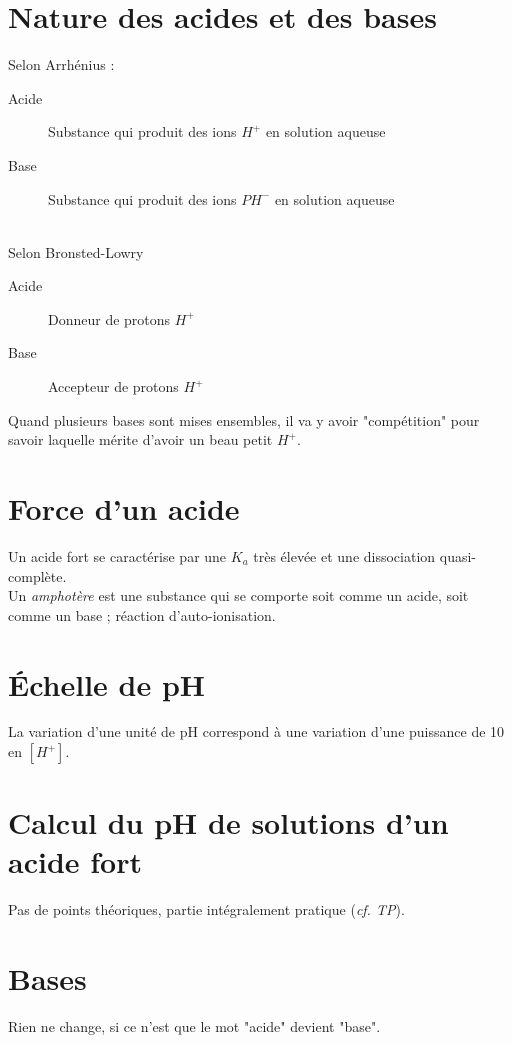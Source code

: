 \documentclass[british,french,11pt, a4paper, openany]{book}
\begin{document}
\section{Nature des acides et des bases}
Selon Arrhénius : 
\begin{description}
	\item[Acide] Substance qui produit des ions $H^+$ en solution aqueuse
	\item[Base] Substance qui produit des ions $PH^-$ en solution aqueuse
\end{description}
\ \\

Selon Bronsted-Lowry 
\begin{description}
	\item[Acide] Donneur de protons $H^+$
	\item[Base] Accepteur de protons $H^+$
\end{description}

Quand plusieurs bases sont mises ensembles, il va y avoir "compétition" pour savoir laquelle mérite d'avoir un beau petit $H^+$.

\section{Force d'un acide}
Un acide fort se caractérise par une $K_a$ très élevée et une dissociation quasi-complète.\\

Un \textit{amphotère} est une substance qui se comporte soit comme un acide, soit comme un base ; réaction d'auto-ionisation.

\section{Échelle de pH}
La variation d'une unité de pH correspond à une variation d'une puissance de 10 en $[H^+]$.

\section{Calcul du pH de solutions d'un acide fort}
Pas de points théoriques, partie intégralement pratique (\textit{cf. TP}).

\section{Bases}
Rien ne change, si ce n'est que le mot "acide" devient "base".
\end{document}
